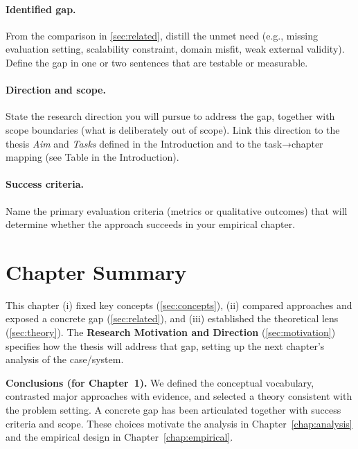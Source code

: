 \paragraph{Identified gap.}
From the comparison in \cref{sec:related}, distill the unmet need (e.g., missing evaluation setting, scalability constraint, domain misfit, weak external validity). Define the gap in one or two sentences that are testable or measurable.

\paragraph{Direction and scope.}
State the research direction you will pursue to address the gap, together with scope boundaries (what is deliberately out of scope). Link this direction to the thesis \emph{Aim} and \emph{Tasks} defined in the Introduction and to the task→chapter mapping (see Table in the Introduction).

\paragraph{Success criteria.}
Name the primary evaluation criteria (metrics or qualitative outcomes) that will determine whether the approach succeeds in your empirical chapter.

\section{Chapter Summary}
\label{sec:summary}
This chapter (i) fixed key concepts (\cref{sec:concepts}), (ii) compared approaches and exposed a concrete gap (\cref{sec:related}), and (iii) established the theoretical lens (\cref{sec:theory}). The \textbf{Research Motivation and Direction} (\cref{sec:motivation}) specifies how the thesis will address that gap, setting up the next chapter’s analysis of the case/system.

\noindent\textbf{Conclusions (for Chapter~1).}
We defined the conceptual vocabulary, contrasted major approaches with evidence, and selected a theory consistent with the problem setting. A concrete gap has been articulated together with success criteria and scope. These choices motivate the analysis in Chapter~\ref{chap:analysis} and the empirical design in Chapter~\ref{chap:empirical}.
